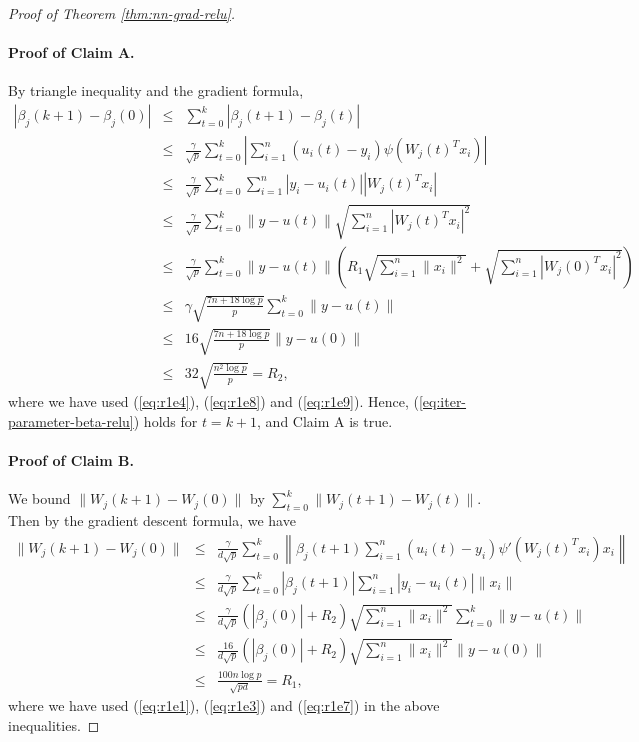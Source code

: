 \begin{proof}[Proof of Theorem \ref{thm:nn-grad-relu}]
\paragraph{Proof of Claim A.}
By triangle inequality and the gradient formula,
\begin{eqnarray*}
|\beta_j(k+1)-\beta_j(0)| &\leq& \sum_{t=0}^k|\beta_j(t+1)-\beta_j(t)| \\
&\leq& \frac{\gamma}{\sqrt{p}}\sum_{t=0}^k\left|\sum_{i=1}^n(u_i(t)-y_i)\psi(W_j(t)^Tx_i)\right| \\
&\leq& \frac{\gamma}{\sqrt{p}}\sum_{t=0}^k\sum_{i=1}^n|y_i-u_i(t)||W_j(t)^Tx_i| \\
&\leq& \frac{\gamma}{\sqrt{p}}\sum_{t=0}^k\|y-u(t)\|\sqrt{\sum_{i=1}^n|W_j(t)^Tx_i|^2} \\
&\leq& \frac{\gamma}{\sqrt{p}}\sum_{t=0}^k\|y-u(t)\|\left(R_1\sqrt{\sum_{i=1}^n\|x_i\|^2}+\sqrt{\sum_{i=1}^n|W_j(0)^Tx_i|^2}\right) \\
&\leq& \gamma\sqrt{\frac{7n+18\log p}{p}}\sum_{t=0}^k\|y-u(t)\| \\
&\leq& 16\sqrt{\frac{7n+18\log p}{p}}\|y-u(0)\| \\
&\leq& 32\sqrt{\frac{n^2\log p}{p}} = R_2,
\end{eqnarray*}
where we have used (\ref{eq:r1e4}), (\ref{eq:r1e8}) and (\ref{eq:r1e9}).
Hence, (\ref{eq:iter-parameter-beta-relu}) holds for $t=k+1$, and Claim A is true.


\paragraph{Proof of Claim B.} We bound $\|W_j(k+1)-W_j(0)\|$ by $\sum_{t=0}^k\|W_j(t+1)-W_j(t)\|$. Then by the gradient descent formula, we have
\begin{eqnarray*}
\|W_j(k+1)-W_j(0)\| &\leq& \frac{\gamma}{d\sqrt{p}}\sum_{t=0}^k\left\|\beta_j(t+1)\sum_{i=1}^n(u_i(t)-y_i)\psi'(W_j(t)^Tx_i)x_i\right\| \\
&\leq& \frac{\gamma}{d\sqrt{p}}\sum_{t=0}^k|\beta_j(t+1)|\sum_{i=1}^n|y_i-u_i(t)|\|x_i\| \\
&\leq& \frac{\gamma}{d\sqrt{p}}(|\beta_j(0)|+R_2)\sqrt{\sum_{i=1}^n\|x_i\|^2}\sum_{t=0}^k\|y-u(t)\| \\
&\leq& \frac{16}{d\sqrt{p}}(|\beta_j(0)|+R_2)\sqrt{\sum_{i=1}^n\|x_i\|^2}\|y-u(0)\| \\
&\leq& \frac{100n\log p}{\sqrt{pd}} = R_1,
\end{eqnarray*}
where we have used (\ref{eq:r1e1}), (\ref{eq:r1e3}) and (\ref{eq:r1e7}) in the above inequalities.


\end{proof}
